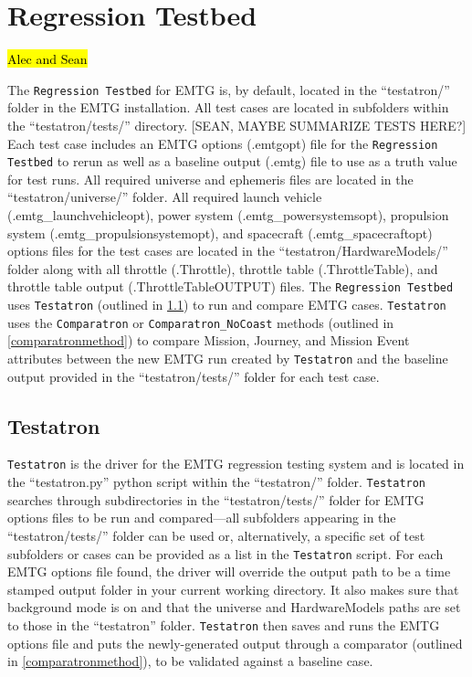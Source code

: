 \chapter{Regression Testbed}
\label{chap:regression_testing}

\hl{Alec and Sean}

The \texttt{Regression Testbed} for \ac{EMTG} is, by default, located in the ``testatron/'' folder in the \ac{EMTG} installation. All test cases are located in subfolders within the ``testatron/tests/'' directory. [SEAN, MAYBE SUMMARIZE TESTS HERE?] Each test case includes an \ac{EMTG} options (.emtgopt) file for the \texttt{Regression Testbed} to rerun as well as a baseline output (.emtg) file to use as a truth value for test runs. All required universe and ephemeris files are located in the ``testatron/universe/'' folder. All required launch vehicle (.emtg\_launchvehicleopt), power system (.emtg\_powersystemsopt), propulsion system (.emtg\_propulsionsystemopt), and spacecraft (.emtg\_spacecraftopt) options files for the test cases are located in the ``testatron/HardwareModels/'' folder along with all throttle (.Throttle), throttle table (.ThrottleTable), and throttle table output (.ThrottleTableOUTPUT) files. The \texttt{Regression Testbed} uses \texttt{Testatron} (outlined in \ref{testatron}) to run and compare \ac{EMTG} cases. \texttt{Testatron} uses the \texttt{Comparatron} or \texttt{Comparatron\_NoCoast} methods (outlined in \ref{comparatronmethod}) to compare Mission, Journey, and Mission Event attributes between the new \ac{EMTG} run created by \texttt{Testatron} and the baseline output provided in the ``testatron/tests/'' folder for each test case.

\section{Testatron}
\label{testatron}

\texttt{Testatron} is the driver for the \ac{EMTG} regression testing system and is located in the ``testatron.py'' python script within the ``testatron/'' folder. \texttt{Testatron} searches through subdirectories in the ``testatron/tests/'' folder for \ac{EMTG} options files to be run and compared---all subfolders appearing in the ``testatron/tests/'' folder can be used or, alternatively, a specific set of test subfolders or cases can be provided as a list in the \texttt{Testatron} script. For each \ac{EMTG} options file found, the driver will override the output path to be a time stamped output folder in your current working directory. It also makes sure that background mode is on and that the universe and HardwareModels paths are set to those in the ``testatron'' folder. \texttt{Testatron} then saves and runs the \ac{EMTG} options file and puts the newly-generated output through a comparator (outlined in \ref{comparatronmethod}), to be validated against a baseline case.

